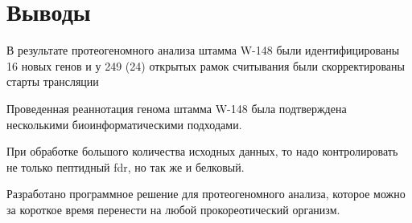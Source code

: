 \newpage

\section{Выводы}
В результате протеогеномного анализа штамма  W-148 были идентифицированы 16 новых генов и у 249 (24) открытых рамок считывания были скорректированы старты трансляции

Проведенная реаннотация генома штамма  W-148 была подтверждена несколькими биоинформатическими подходами.

При обработке большого количества исходных данных, то надо контролировать не только пептидный fdr, но так же и белковый.

Разработано программное решение для протеогеномного анализа, которое можно за короткое время перенести на любой прокореотический организм. 
\newpage
